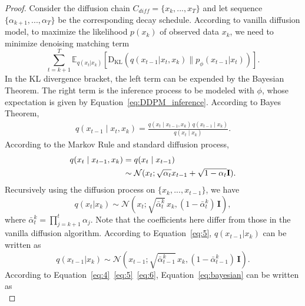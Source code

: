 \begin{proof}
Consider the diffusion chain $C_{diff}=\{x_k,...,x_T\}$ and let sequence  $\{\alpha_{k+1},...,\alpha_T\}$ be the corresponding decay schedule. 
According to vanilla diffusion model, to maximize the likelihood $p(x_k)$ of observed data $x_k$, we need to minimize denoising matching term
\begin{equation}\label{eq:KL divergence}
    \sum_{t=k+1}^{T} \mathbb{E}_{q(x_t | x_k)} \left[ \mathrm{D}_{\mathrm{KL}}\left( q(x_{t-1} | x_t, x_k) \parallel p_{\phi}(x_{t-1} | x_t) \right) \right].
\end{equation}
In the KL divergence bracket, the left term can be expended by the Bayesian Theorem. The right term is the inference process to be modeled with $\phi$, whose expectation is given by Equation~\ref{eq:DDPM_inference}. According to Bayes Theorem,
\begin{align}\label{eq:bayesian}
    q(x_{t-1} \mid x_t, x_k) = \frac{q(x_t \mid x_{t-1}, x_k) \, q(x_{t-1} \mid x_k)}{q(x_t \mid x_k)}.
\end{align}
According to the Markov Rule and standard diffusion process, 
\begin{align}\label{eq:4}
    q(x_t \mid x_{t-1}, x_k) &= q(x_t \mid x_{t-1}) \notag\\
    &\sim \mathcal{N}(x_t;\sqrt{\alpha_t}x_{t-1}+\sqrt{1-\alpha_t}\mathbf{I}).
\end{align}
Recursively using the diffusion process on $\{x_k,..., x_{t-1}\}$, we have
\begin{equation}\label{eq:5}
    q(x_t|x_k) \sim \mathcal{N}(x_t; \sqrt{{\bar{\alpha}_t^k}} \, x_k, (1 - {\bar{\alpha}_t^k}) \, \mathbf{I}),
\end{equation}
where ${\bar{\alpha}_t^k}=\prod_{j=k+1}^t \alpha_j$. Note that the coefficients here differ from those in the vanilla diffusion algorithm. 
According to Equation~\ref{eq:5}, $q(x_{t-1}|x_k)$ can be written as
\begin{equation}\label{eq:6}
    q(x_{t-1}|x_k) \sim \mathcal{N}(x_{t-1}; \sqrt{{\bar{\alpha}_{t-1}^k}} \, x_k, (1 - {\bar{\alpha}_{t-1}^k}) \, \mathbf{I}).
\end{equation}
According to Equation~\ref{eq:4}~\ref{eq:5}~\ref{eq:6}, Equation~\ref{eq:bayesian} can be written as\\
\end{proof}

